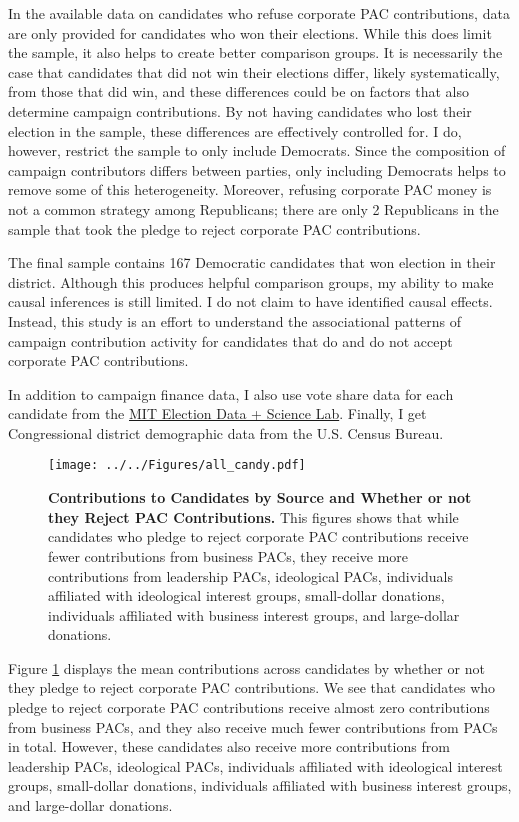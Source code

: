 \documentclass[12pt]{article}
\begin{document}
In the available data on candidates who refuse corporate PAC contributions, data are only provided for candidates who won their elections. While this does limit the sample, it also helps to create better comparison groups. It is necessarily the case that candidates that did not win their elections differ, likely systematically, from those that did win, and these differences could be on factors that also determine campaign contributions. By not having candidates who lost their election in the sample, these differences are effectively controlled for. I do, however, restrict the sample to only include Democrats. Since the composition of campaign contributors differs between parties, only including Democrats helps to remove some of this heterogeneity. Moreover, refusing corporate PAC money is not a common strategy among Republicans; there are only 2 Republicans in the sample that took the pledge to reject corporate PAC contributions.

The final sample contains 167 Democratic candidates that won election in their district. Although this produces helpful comparison groups, my ability to make causal inferences is still limited. I do not claim to have identified causal effects. Instead, this study is an effort to understand the associational patterns of campaign contribution activity for candidates that do and do not accept corporate PAC contributions. 

In addition to campaign finance data, I also use vote share data for each candidate from the \href{https://electionlab.mit.edu/data}{MIT Election Data + Science Lab}. Finally, I get Congressional district demographic data from the U.S. Census Bureau.  

\begin{figure}[!htb]
    \centering
    \texttt{[image: ../../Figures/all\_candy.pdf]}
    \caption{\textbf{Contributions to Candidates by Source and Whether or not they Reject PAC Contributions.} This figures shows that while candidates who pledge to reject corporate PAC contributions receive fewer contributions from business PACs, they receive more contributions from leadership PACs, ideological PACs, individuals affiliated with ideological interest groups, small-dollar donations, individuals affiliated with business interest groups, and large-dollar donations.}
    \label{fig: all contribs}
\end{figure}

Figure \ref{fig: all contribs} displays the mean contributions across candidates by whether or not they pledge to reject corporate PAC contributions. We see that candidates who pledge to reject corporate PAC contributions receive almost zero contributions from business PACs, and they also receive much fewer contributions from PACs in total. However, these candidates also receive more contributions from leadership PACs, ideological PACs, individuals affiliated with ideological interest groups, small-dollar donations, individuals affiliated with business interest groups, and large-dollar donations.
\end{document}
